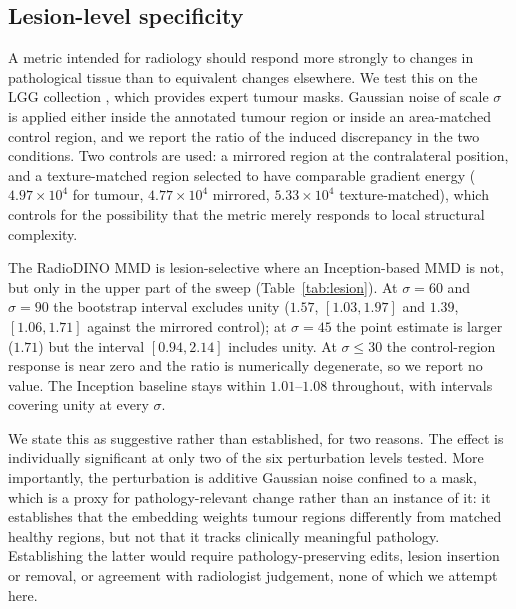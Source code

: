 \subsection{Lesion-level specificity}
\label{sec:res_lesion}

A metric intended for radiology should respond more strongly to changes in
pathological tissue than to equivalent changes elsewhere. We test this on the
LGG collection \citep{buda2019association}, which provides expert tumour masks.
Gaussian noise of scale $\sigma$ is applied either inside the annotated tumour
region or inside an area-matched control region, and we report the ratio of the
induced discrepancy in the two conditions. Two controls are used: a mirrored
region at the contralateral position, and a texture-matched region selected to
have comparable gradient energy ($4.97\times10^{4}$ for tumour,
$4.77\times10^{4}$ mirrored, $5.33\times10^{4}$ texture-matched), which
controls for the possibility that the metric merely responds to local
structural complexity.

The RadioDINO MMD is lesion-selective where an Inception-based MMD is not, but
only in the upper part of the sweep (Table~\ref{tab:lesion}). At $\sigma = 60$
and $\sigma = 90$ the bootstrap interval excludes unity ($1.57$,
$[1.03, 1.97]$ and $1.39$, $[1.06, 1.71]$ against the mirrored control); at
$\sigma = 45$ the point estimate is larger ($1.71$) but the interval
$[0.94, 2.14]$ includes unity. At $\sigma \le 30$ the control-region response is
near zero and the ratio is numerically degenerate, so we report no value. The
Inception baseline stays within $1.01$--$1.08$ throughout, with intervals
covering unity at every $\sigma$.

We state this as suggestive rather than established, for two reasons. The
effect is individually significant at only two of the six perturbation levels
tested. More importantly, the perturbation is additive Gaussian noise confined
to a mask, which is a proxy for pathology-relevant change rather than an
instance of it: it establishes that the embedding weights tumour regions
differently from matched healthy regions, but not that it tracks clinically
meaningful pathology. Establishing the latter would require
pathology-preserving edits, lesion insertion or removal, or agreement with
radiologist judgement, none of which we attempt here.

